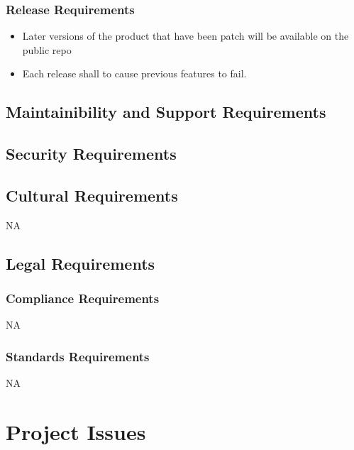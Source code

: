 \documentclass[12pt]{article}
\begin{document}
\subsubsection{Release Requirements}
\begin{itemize}
	\item Later versions of the product that have been patch will be available on the public repo
	\item Each release shall to cause previous features to fail.
\end{itemize}

\subsection{Maintainibility and Support Requirements} %

\subsection{Security Requirements} %

\subsection{Cultural Requirements} %
NA

\subsection{Legal Requirements} %
\subsubsection{Compliance Requirements}
NA
\subsubsection{Standards Requirements}
NA

\section{Project Issues}

\end{document}
